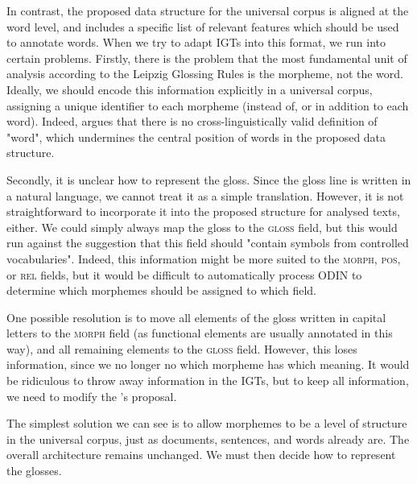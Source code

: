 In contrast, the proposed data structure for the universal corpus is aligned at the word level, and includes a specific list of relevant features which should be used to annotate words. When we try to adapt IGTs into this format, we run into certain problems.  Firstly, there is the problem that the most fundamental unit of analysis according to the Leipzig Glossing Rules is the morpheme, not the word.  Ideally, we should encode this information explicitly in a universal corpus, assigning a unique identifier to each morpheme (instead of, or in addition to each word). Indeed,  argues that there is no cross-linguistically valid definition of "word", which undermines the central position of words in the proposed data structure.

Secondly, it is unclear how to represent the gloss.  Since the gloss line is written in a natural language, we cannot treat it as a simple translation.  However, it is not straightforward to incorporate it into the proposed structure for analysed texts, either.  We could simply always map the gloss to the \textsc{gloss} field, but this would run against the suggestion that this field should "contain symbols from controlled vocabularies".  Indeed, this information might be more suited to the \textsc{morph, pos,} or \textsc{rel} fields, but it would be difficult to automatically process ODIN to determine which morphemes should be assigned to which field.

One possible resolution is to move all elements of the gloss written in capital letters to the \textsc{morph} field (as functional elements are usually annotated in this way), and all remaining elements to the \textsc{gloss} field.  However, this loses information, since we no longer no which morpheme has which meaning.  It would be ridiculous to throw away information in the IGTs, but to keep all information, we need to modify the 's proposal.

The simplest solution we can see is to allow morphemes to be a level of structure in the universal corpus, just as documents, sentences, and words already are.  The overall architecture remains unchanged.  We must then decide how to represent the glosses.

